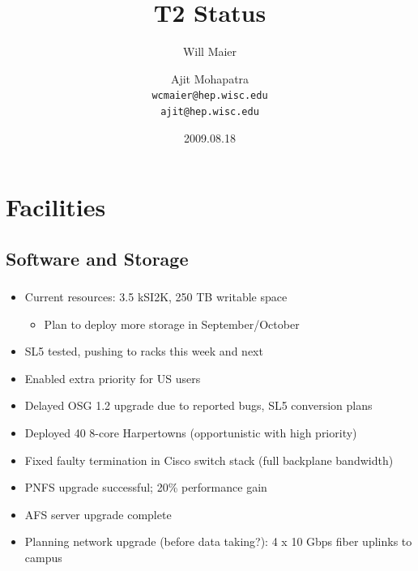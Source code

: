 \documentclass{beamer}
\title{T2 Status}
\author[Maier, Mohapatra]{
    Will Maier \and Ajit Mohapatra\\ 
    {\tt wcmaier@hep.wisc.edu}\\
    {\tt ajit@hep.wisc.edu}}
\institute[Wisconsin]{University of Wisconsin - High Energy Physics}
\date{2009.08.18}
\begin{document}
\begin{frame}
    \titlepage
\end{frame}


\section{Facilities}
\subsection{Software and Storage}
\begin{frame}
\frametitle{}

\begin{itemize}
	\item Current resources: 3.5 kSI2K, 250 TB writable space
	\begin{itemize}
		\item Plan to deploy more storage in September/October
	\end{itemize}
	\item SL5 tested, pushing to racks this week and next
	\item Enabled extra priority for US users
	\item Delayed OSG 1.2 upgrade due to reported bugs, SL5 conversion plans
	\item Deployed 40 8-core Harpertowns (opportunistic with high priority)
	\item Fixed faulty termination in Cisco switch stack (full backplane bandwidth)
	\item PNFS upgrade successful; 20\% performance gain
	\item AFS server upgrade complete
	\item Planning network upgrade (before data taking?): 4 x 10 Gbps fiber uplinks to campus
\end{itemize}

\end{frame}
\end{document}
